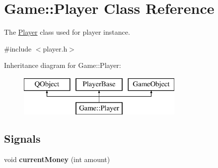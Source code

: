 \hypertarget{class_game_1_1_player}{\section{Game\-:\-:Player Class Reference}
\label{class_game_1_1_player}
}


The \hyperlink{class_game_1_1_player}{Player} class used for player instance.  




{\ttfamily \#include $<$player.\-h$>$}

Inheritance diagram for Game\-:\-:Player\-:\begin{figure}[H]
\begin{center}
\leavevmode
\includegraphics[height=2.000000cm]{class_game_1_1_player}
\end{center}
\end{figure}
\subsection*{Signals}
\begin{DoxyCompactItemize}
\item 
\hypertarget{class_game_1_1_player_ae54c71f3ca4f5001aa790802b046f7bf}{void {\bfseries current\-Money} (int amount)}\label{class_game_1_1_player_ae54c71f3ca4f5001aa790802b046f7bf}

\end{DoxyCompactItemize}
